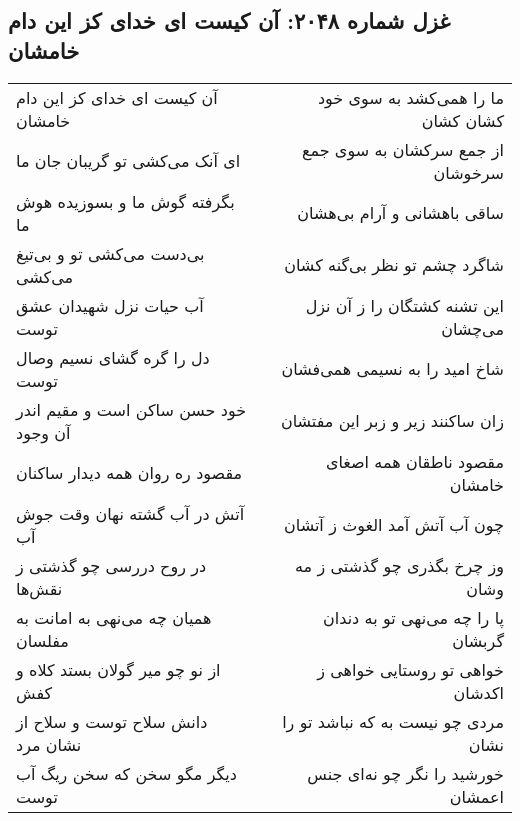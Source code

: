 \begin{center}
\section*{غزل شماره ۲۰۴۸: آن کیست ای خدای کز این دام خامشان}
\label{sec:2048}
\begin{longtable}{l p{0.5cm} r}
آن کیست ای خدای کز این دام خامشان
&&
ما را همی‌کشد به سوی خود کشان کشان
\\
ای آنک می‌کشی تو گریبان جان ما
&&
از جمع سرکشان به سوی جمع سرخوشان
\\
بگرفته گوش ما و بسوزیده هوش ما
&&
ساقی باهشانی و آرام بی‌هشان
\\
بی‌دست می‌کشی تو و بی‌تیغ می‌کشی
&&
شاگرد چشم تو نظر بی‌گنه کشان
\\
آب حیات نزل شهیدان عشق توست
&&
این تشنه کشتگان را ز آن نزل می‌چشان
\\
دل را گره گشای نسیم وصال توست
&&
شاخ امید را به نسیمی همی‌فشان
\\
خود حسن ساکن است و مقیم اندر آن وجود
&&
زان ساکنند زیر و زبر این مفتشان
\\
مقصود ره روان همه دیدار ساکنان
&&
مقصود ناطقان همه اصغای خامشان
\\
آتش در آب گشته نهان وقت جوش آب
&&
چون آب آتش آمد الغوث ز آتشان
\\
در روح دررسی چو گذشتی ز نقش‌ها
&&
وز چرخ بگذری چو گذشتی ز مه وشان
\\
همیان چه می‌نهی به امانت به مفلسان
&&
پا را چه می‌نهی تو به دندان گربشان
\\
از نو چو میر گولان بستد کلاه و کفش
&&
خواهی تو روستایی خواهی ز اکدشان
\\
دانش سلاح توست و سلاح از نشان مرد
&&
مردی چو نیست به که نباشد تو را نشان
\\
دیگر مگو سخن که سخن ریگ آب توست
&&
خورشید را نگر چو نه‌ای جنس اعمشان
\\
\end{longtable}
\end{center}

